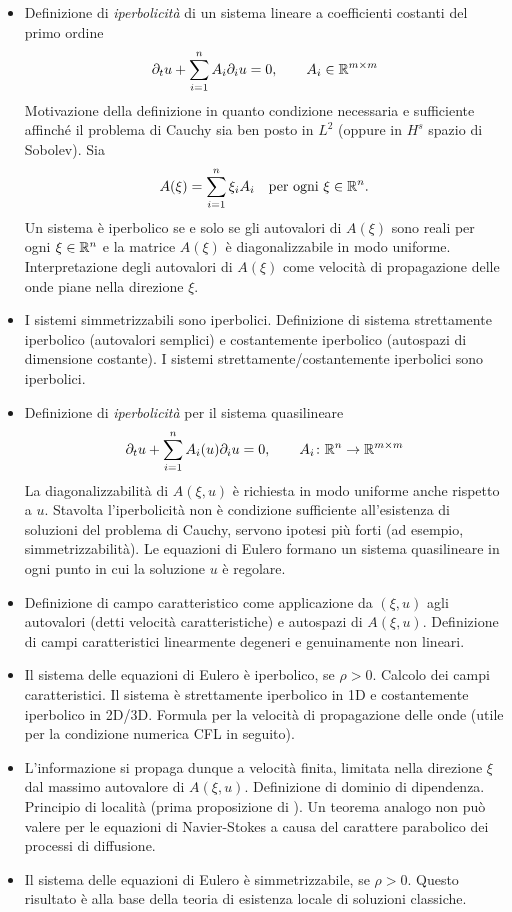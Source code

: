 \begin{itemize}
\item Definizione di \emph{iperbolicità} di un sistema lineare
	a coefficienti costanti del primo ordine
	\[
	\partial_t u + \sum_{i=1}^n A_i \partial_i u = 0,
	\qquad A_i \in \mathbb{R}^{m \times m}
	\]
	Motivazione della definizione in quanto condizione necessaria e
	sufficiente affinché il problema di Cauchy
	sia ben posto in $L^2$ (oppure in $H^s$ spazio di Sobolev).
	Sia
	\[
	A(\xi) = \sum_{i=1}^n \xi_i A_i
	\quad 	\text{per ogni $\xi \in \mathbb{R}^n$.}
	\]
	Un sistema è iperbolico se e solo se gli autovalori di $A(\xi)$
	sono reali per ogni $\xi \in \mathbb{R}^n$ e la matrice $A(\xi)$
	è diagonalizzabile in modo uniforme.
	Interpretazione degli autovalori di $A(\xi)$ come velocità
	di propagazione delle onde piane nella direzione $\xi$.
\item I sistemi simmetrizzabili sono iperbolici. Definizione di sistema
	strettamente iperbolico (autovalori semplici) e costantemente iperbolico
	(autospazi di dimensione costante).
	I sistemi strettamente/costantemente iperbolici sono iperbolici.
\item Definizione di \emph{iperbolicità} per il sistema quasilineare
	\[
	\partial_t u + \sum_{i=1}^n A_i(u) \partial_i u = 0,
	\qquad A_i \colon \mathbb{R}^n \to \mathbb{R}^{m \times m}
	\]
	La diagonalizzabilità di $A(\xi,u)$ è richiesta in modo uniforme
	anche rispetto a $u$.
	Stavolta l'iperbolicità non è condizione sufficiente all'esistenza
	di soluzioni del problema di Cauchy, servono ipotesi più forti
	(ad esempio, simmetrizzabilità). Le equazioni di Eulero
	formano un sistema quasilineare in ogni punto in cui
	la soluzione $u$ è regolare.
\item Definizione di campo caratteristico come applicazione da $(\xi,u)$
	agli autovalori (detti velocità caratteristiche) e autospazi di $A(\xi,u)$.
	Definizione di campi caratteristici linearmente degeneri e
	genuinamente non lineari.
\item Il sistema delle equazioni di Eulero è iperbolico, se $\rho > 0$.
	Calcolo dei campi caratteristici. Il sistema è strettamente iperbolico
	in 1D e costantemente iperbolico in 2D/3D.
	Formula per la velocità di propagazione delle onde
	(utile per la condizione numerica CFL in seguito).
\item L'informazione si propaga dunque a velocità finita, limitata nella
	direzione $\xi$ dal massimo autovalore di $A(\xi,u)$.
	Definizione di dominio di dipendenza.
	Principio di località (prima proposizione di \cite{sideris84}).
	Un teorema analogo non può valere per le equazioni di Navier-Stokes
	a causa del carattere parabolico dei processi di diffusione.
\item Il sistema delle equazioni di Eulero è simmetrizzabile, se $\rho > 0$.
	Questo risultato è alla base della teoria di esistenza locale di soluzioni
	classiche.
\end{itemize}


